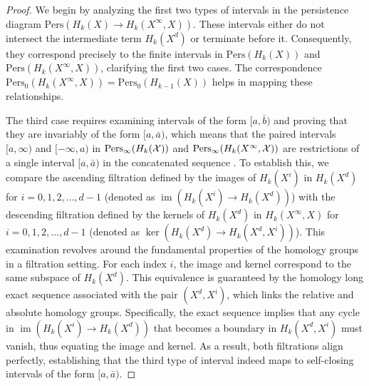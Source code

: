 \begin{proof}
	We begin by analyzing the first two types of intervals in the persistence diagram
	$\mathrm{Pers}(H_{k}(X) \to H_{k}(X^{\infty}, X))$. These intervals either do
	not intersect the intermediate term $H_{k}(X^{d})$ or terminate before it. Consequently,
	they correspond precisely to the finite intervals in $\mathrm{Pers}(H_{k}(X))$
	and $\mathrm{Pers}(H_{k}(X^{\infty}, X))$, clarifying the first two cases. The
	correspondence $\mathrm{Pers}_{0}(H_{k}(X^{\infty}, X)) = \mathrm{Pers}_{0}(H_{k-1}(X))$
	helps in mapping these relationships.

	The third case requires examining intervals of the form $[a, \bar{b})$ and
	proving that they are invariably of the form $[a, \bar{a})$, which means that
	the paired intervals $[a,\infty)$ and $[-\infty,a)$ in $\mathrm{Pers}_{\infty}(
	H_{k}({\mathcal{X}}))$ and $\mathrm{Pers}_{\infty}(H_{k}(X^{\infty}, {\mathcal{X}}))$ are restrictions
	of a single interval $[a,\bar{a})$ in the concatenated sequence \cite[Proof of Proposition 2.5]{de2011dualities}.
	To establish this, we compare the ascending filtration defined by the images of
	$H_{k}(X^{i})$ in $H_{k}(X^{d})$ for $i = 0, 1, 2, \ldots, d-1$ (denoted as
	$\operatorname{im}(H_{k}(X^{i}) \to H_{k}(X^{d}))$) with the descending filtration defined
	by the kernels of $H_{k}(X^{d})$ in $H_{k}(X^{\infty}, X)$ for $i = 0, 1, 2, \ldots
	, d-1$ (denoted as $\ker(H_{k}(X^{d}) \to H_{k}(X^{d}, X^{i}))$). This
	examination revolves around the fundamental properties of the homology groups
	in a filtration setting. For each index $i$, the image and kernel correspond to the same subspace of $H_{k}
	(X^{d})$. This equivalence is guaranteed by the homology long exact sequence
	associated with the pair $(X^{d}, X^{i})$, which links the relative and absolute
	homology groups. Specifically, the exact sequence implies that any cycle in $\operatorname{im}
	(H_{k}(X^{i}) \to H_{k}(X^{d}))$ that becomes a boundary in $H_{k}(X^{d}, X^{i}
	)$ must vanish, thus equating the image and kernel. As a result, both
	filtrations align perfectly, establishing that the third type of interval indeed
	maps to self-closing intervals of the form $[a, \bar{a})$.
\end{proof}


